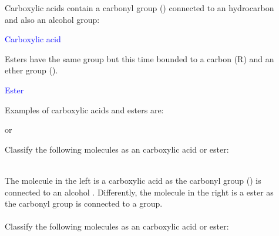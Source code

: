 \documentclass[main.tex]{subfiles}
\begin{document}
\begin{description}
\item[] Carboxylic acids contain a carbonyl group () connected to an hydrocarbon and also an alcohol group:
\begin{center}\hspace{0.5cm}\textcolor{blue}{Carboxylic acid}\end{center}
Esters have the same  group but this time bounded to a carbon (R) and an ether group (). 
\begin{center}\hspace{0.5cm}\textcolor{blue}{Ester}\end{center}
Examples of carboxylic acids and esters are:
\begin{center}\hspace{1cm} or \hspace{1cm}\end{center}
\begin{example} %
Classify the following molecules as an carboxylic acid or ester:
\begin{center} \hspace{0.5cm}  \end{center}
\\
The molecule in the left is a carboxylic acid as the carbonyl group () is connected to an alcohol . Differently, the molecule in the right is a ester as the carbonyl group is connected to a  group.
\\
\faDiamond\ \\
Classify the following molecules as an carboxylic acid or ester:
\begin{center}    \hspace{0.5cm}     \end{center}

\end{example}%



\end{description}
\end{document}

